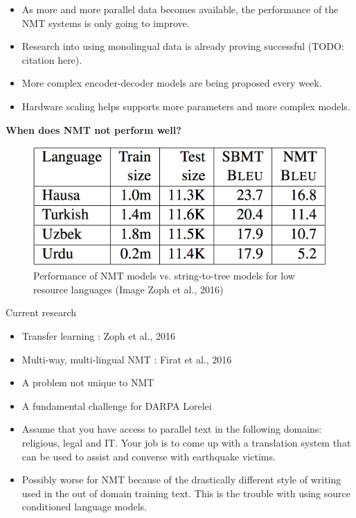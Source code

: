 \documentclass[landscape]{jhuslides3C}
\begin{document}
\begin{itemize}
\item As more and more parallel data becomes available, the performance of the NMT systems is only going to improve.
\item Research into using monolingual data is already proving successful (TODO: citation here).
\item More complex encoder-decoder models are being proposed every week.
\item Hardware scaling helps supports more parameters and more complex models.
\end{itemize}
\textbf{When does NMT not perform well?}

\begin{figure}
\begin{center}
\includegraphics[scale=0.5]{images/low-res.png}
\caption{Performance of NMT models vs. string-to-tree models for low resource languages ({\tiny Image Zoph et al., 2016})}
\end{center}
\end{figure}
Current research
\begin{itemize}
\item Transfer learning : Zoph et al., 2016
\item Multi-way, multi-lingual NMT : Firat et al., 2016
\end{itemize}

\begin{itemize}
\item A problem not unique to NMT
\item A fundamental challenge for DARPA Lorelei
\item Assume that you have access to parallel text in the following domains: religious, legal and IT. Your job is to come up with a translation system that can be used to assist and converse with earthquake victims.
\item Possibly worse for NMT because of the drastically different style of writing used in the out of domain training text. This is the trouble with using source conditioned language models.
\end{itemize}
\end{document}
